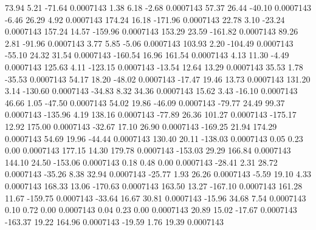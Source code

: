        73.94        5.21      -71.64     0.0007143
        1.38        6.18       -2.68     0.0007143
       57.37       26.44      -40.10     0.0007143
       -6.46       26.29        4.92     0.0007143
      174.24       16.18     -171.96     0.0007143
       22.78        3.10      -23.24     0.0007143
      157.24       14.57     -159.96     0.0007143
      153.29       23.59     -161.82     0.0007143
       89.26        2.81      -91.96     0.0007143
        3.77        5.85       -5.06     0.0007143
      103.93        2.20     -104.49     0.0007143
      -55.10       24.32       31.54     0.0007143
     -160.54       16.96      161.54     0.0007143
        4.13       11.30       -4.49     0.0007143
      125.63        4.11     -123.15     0.0007143
      -13.54       12.64       13.29     0.0007143
       35.53        1.78      -35.53     0.0007143
       54.17       18.20      -48.02     0.0007143
      -17.47       19.46       13.73     0.0007143
      131.20        3.14     -130.60     0.0007143
      -34.83        8.32       34.36     0.0007143
       15.62        3.43      -16.10     0.0007143
       46.66        1.05      -47.50     0.0007143
       54.02       19.86      -46.09     0.0007143
      -79.77       24.49       99.37     0.0007143
     -135.96        4.19      138.16     0.0007143
      -77.89       26.36      101.27     0.0007143
     -175.17       12.92      175.00     0.0007143
      -32.67       17.10       26.90     0.0007143
     -169.25       21.94      174.29     0.0007143
       54.69       19.96      -44.44     0.0007143
      130.40       20.11     -138.03     0.0007143
        0.05        0.23        0.00     0.0007143
      177.15       14.30      179.78     0.0007143
     -153.03       29.29      166.84     0.0007143
      144.10       24.50     -153.06     0.0007143
        0.18        0.48        0.00     0.0007143
      -28.41        2.31       28.72     0.0007143
      -35.26        8.38       32.94     0.0007143
      -25.77        1.93       26.26     0.0007143
       -5.59       19.10        4.33     0.0007143
      168.33       13.06     -170.63     0.0007143
      163.50       13.27     -167.10     0.0007143
      161.28       11.67     -159.75     0.0007143
      -33.64       16.67       30.81     0.0007143
      -15.96       34.68        7.54     0.0007143
        0.10        0.72        0.00     0.0007143
        0.04        0.23        0.00     0.0007143
       20.89       15.02      -17.67     0.0007143
     -163.37       19.22      164.96     0.0007143
      -19.59        1.76       19.39     0.0007143

